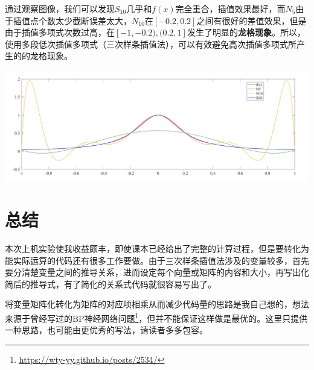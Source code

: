 \documentclass[12pt, a4paper, oneside]{ctexart}
\begin{document}
通过观察图像，我们可以发现$S_{10}$几乎和$f(x)$完全重合，插值效果最好，而$N_{5}$由于插值点个数太少截断误差太大，$N_{10}$在$[-0.2,0.2]$之间有很好的差值效果，但是由于插值多项式次数过高，在$[-1,-0.2),(0.2,1]$发生了明显的\textbf{龙格现象}。所以，使用多段低次插值多项式（三次样条插值法），可以有效避免高次插值多项式所产生的的龙格现象。

\centerline{
    \includegraphics[width=1.2\textwidth]{figure.png}
}

\section{总结}
本次上机实验使我收益颇丰，即使课本已经给出了完整的计算过程，但是要转化为能实际运算的代码还有很多工作要做。由于三次样条插值法涉及的变量较多，首先要分清楚变量之间的推导关系，进而设定每个向量或矩阵的内容和大小，再写出化简后的推导式，有了简化的关系式代码就很容易写出了。

将变量矩阵化转化为矩阵的对应项相乘从而减少代码量的思路是我自己想的，想法来源于曾经写过的$\text{BP神经网络}$问题\footnote{\url{https://wty-yy.github.io/posts/2534/}}，但并不能保证这样做是最优的。这里只提供一种思路，也可能由更优秀的写法，请读者多多包容。
\end{document}
